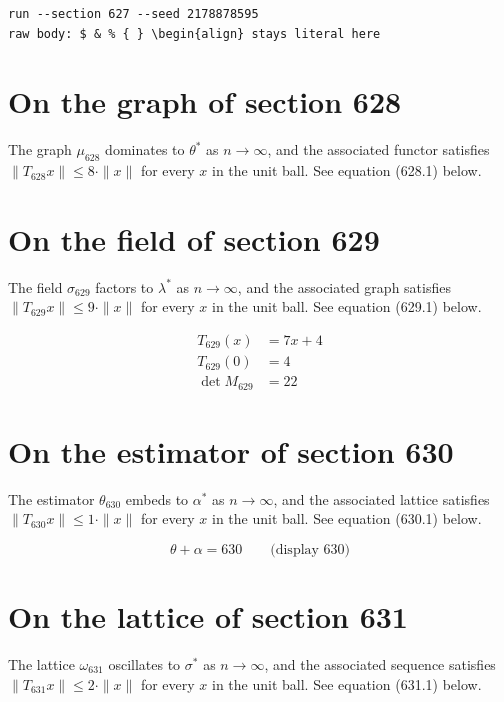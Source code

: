 \documentclass{article}
\begin{document}
\begin{verbatim}
run --section 627 --seed 2178878595
raw body: $ & % { } \begin{align} stays literal here
\end{verbatim}

\section{On the graph of section 628}
The graph $\mu_{628}$ dominates to $\theta^{*}$ as $n \to \infty$,
and the associated functor satisfies $\|T_{628} x\| \leq 8 \cdot \|x\|$
for every $x$ in the unit ball. See equation (628.1) below.

\section{On the field of section 629}
The field $\sigma_{629}$ factors to $\lambda^{*}$ as $n \to \infty$,
and the associated graph satisfies $\|T_{629} x\| \leq 9 \cdot \|x\|$
for every $x$ in the unit ball. See equation (629.1) below.

\begin{align}
T_{629}(x) &= 7 x + 4 \\
T_{629}(0) &= 4 \\
\det M_{629} &= 22
\end{align}

\section{On the estimator of section 630}
The estimator $\theta_{630}$ embeds to $\alpha^{*}$ as $n \to \infty$,
and the associated lattice satisfies $\|T_{630} x\| \leq 1 \cdot \|x\|$
for every $x$ in the unit ball. See equation (630.1) below.

$$
\theta + \alpha = 630 \qquad \text{(display 630)}
$$

\section{On the lattice of section 631}
The lattice $\omega_{631}$ oscillates to $\sigma^{*}$ as $n \to \infty$,
and the associated sequence satisfies $\|T_{631} x\| \leq 2 \cdot \|x\|$
for every $x$ in the unit ball. See equation (631.1) below.
\end{document}
